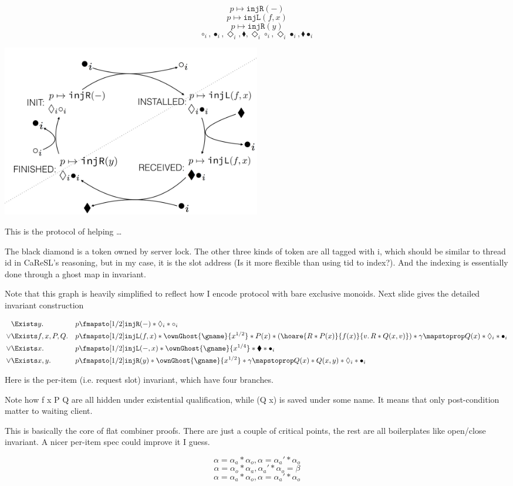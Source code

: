 \documentclass[11pt]{article}
\newcommand{\bdia}{\blacklozenge}
\newcommand{\dia}{\Diamond}
\newcommand{\injR}{\texttt{injR}}
\newcommand{\injL}{\texttt{injL}}
\begin{document}
\[p \mapsto \injR(-)\]
\[p \mapsto \texttt{injL}(f, x)\]
\[p \mapsto \injR(y)\]
\[\circ_i, \bullet_i, \dia_i, \bdia, \dia_i \circ_i, \dia_i \bullet_i, \bdia \bullet_i\]


\includegraphics[width=0.5\textwidth]{helping}

This is the protocol of helping … 

The black diamond is a token owned by server lock.
The other three kinds of token are all tagged with i, which should be similar to thread id in CaReSL’s reasoning, but in my case, it is the slot address (Is it more flexible than using tid to index?). And the indexing is essentially done through a ghost map in invariant. 

Note that this graph is heavily simplified to reflect how I encode protocol with bare exclusive monoids. Next slide gives the detailed invariant construction


\begin{align*}
     &\Exists y.          &&p \fmapsto[1/2] \injR(-) * \dia_i * \circ_i\\
\lor &\Exists f, x, P, Q. &&p \fmapsto[1/2] \injL(f, x) * \ownGhost{\gname}{x^{1/2}} *
                           P(x) * (\hoare{R * P(x)}{f(x)}{v.\,R * Q(x, v)}) * \gamma \mapstoprop Q(x) * \dia_i * \bullet_i\\
\lor &\Exists x.          &&p \fmapsto[1/2] \injL(-, x) * \ownGhost{\gname}{x^{1/4}} * \bdia * \bullet_i\\
\lor &\Exists x, y.       &&p \fmapsto[1/2] \injR(y) * \ownGhost{\gname}{x^{1/2}} * \gamma \mapstoprop Q(x) * Q(x, y) * \dia_i * \bullet_i
\end{align*}

Here is the per-item (i.e. request slot) invariant, which have four branches.

Note how f x P Q are all hidden under existential qualification, while (Q x) is saved under some name. It means that only post-condition matter to waiting client.

This is basically the core of flat combiner proofs. There are just a couple of critical points, the rest are all boilerplates like open/close invariant. A nicer per-item spec could improve it I guess.

\[\alpha = \alpha_a * \alpha_o, \alpha = \alpha_a' * \alpha_o\]
\[\alpha = \alpha_o * \alpha_a, \alpha_a' * \alpha_o = \beta\]
\[\alpha = \alpha_a * \alpha_o, \alpha = \alpha_a' * \alpha_o\]
\end{document}
